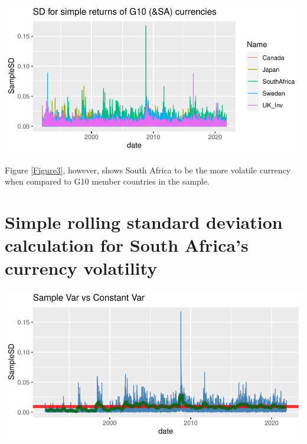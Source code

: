 \documentclass[11pt,preprint, authoryear]{elsarticle}
\let\origfigure\figure
\let\endorigfigure\endfigure
\renewenvironment{figure}[1][2] {
    \expandafter\origfigure\expandafter[H]
} {
    \endorigfigure
}
\numberwithin{equation}{section}
\numberwithin{figure}{section}
\numberwithin{table}{section}
\begin{document}
\begin{figure}[H]

{\centering \includegraphics{Question5_files/figure-latex/Figure3-1} 

}

\caption{Caption Here \label{Figure3}}\label{fig:Figure3}
\end{figure}

Figure \ref{Figure3}, however, shows South Africa to be the more
volatile currency when compared to G10 member countries in the sample.

\hypertarget{simple-rolling-standard-deviation-calculation-for-south-africas-currency-volatility}{%
\section{Simple rolling standard deviation calculation for South
Africa's currency
volatility}\label{simple-rolling-standard-deviation-calculation-for-south-africas-currency-volatility}}

\begin{figure}[H]

{\centering \includegraphics{Question5_files/figure-latex/Figure4-1} 

}

\caption{Caption Here \label{Figure4}}\label{fig:Figure4}
\end{figure}
\end{document}
